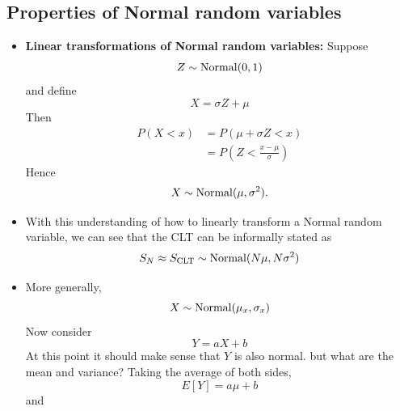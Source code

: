 \subsection{Properties of Normal random variables}
\begin{itemize}

\item {\bf Linear transformations of Normal random variables:}  Suppose 
\begin{equation*}
Z \sim {\rm Normal}(0,1)
\end{equation*}
and define 
\begin{equation*}
X = \sigma Z + \mu 
\end{equation*}
Then 
\begin{align*}
P(X<x) &= P(\mu + \sigma Z<x) \\
&= P\left(Z<\frac{x - \mu}{\sigma}\right)
\end{align*}
Hence 
\begin{equation*}
X \sim {\rm Normal}(\mu,\sigma^2).
\end{equation*} 
\item With this understanding of how to linearly transform a Normal random variable, we can see that the CLT can be informally stated as
\begin{equation*}
S_N \approx S_{\rm CLT} \sim {\rm Normal}(N\mu,N\sigma^2)
\end{equation*}
\item More generally, 
\begin{equation*}
X \sim {\rm Normal}(\mu_x,\sigma_x)
\end{equation*}
Now consider 
\begin{equation*}\label{eq:linear}
Y = aX + b 
\end{equation*}
At this point it should make sense that $Y$ is also normal. 
 but what are the mean and variance? Taking the average of both sides, 
\begin{equation*}
E[Y] = a\mu + b
\end{equation*}
and 
\begin{equation*}

\end{equation*}
\end{itemize}
